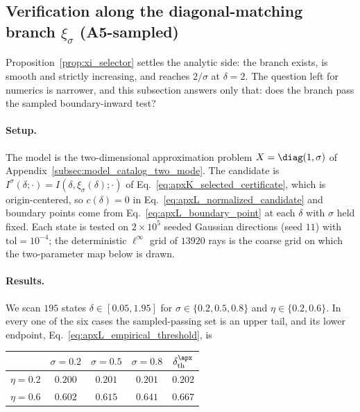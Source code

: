 \documentclass{article}
\begin{document}
\subsection{Verification along the diagonal-matching branch \texorpdfstring{$\xi_\sigma$}{xi\_sigma} (A5-sampled)}
\label{apx:xi_selector_verification}
\label{apx:xi_delta_experiment}%

Proposition~\ref{prop:xi_selector} settles the analytic side: the branch
exists, is smooth and strictly increasing, and reaches $2/\sigma$ at
$\delta=2$. The question left for numerics is narrower, and this subsection
answers only that: does the branch pass the sampled boundary-inward test?

\paragraph{Setup.}
The model is the two-dimensional approximation problem $X=\diag(1,\sigma)$ of
Appendix~\ref{subsec:model_catalog_two_mode}. The candidate is
$I^\sigma(\delta;\cdot)=I(\delta,\xi_\sigma(\delta);\cdot)$ of
Eq.~\eqref{eq:apxK_selected_certificate}, which is origin-centered, so
$c(\delta)=0$ in Eq.~\eqref{eq:apxL_normalized_candidate} and boundary points
come from Eq.~\eqref{eq:apxL_boundary_point} at each $\delta$ with $\sigma$
held fixed. Each state is tested on $2\times10^5$ seeded Gaussian directions
(seed $11$) with $\mathrm{tol}=10^{-4}$; the deterministic $\ell^\infty$ grid
of $13920$ rays is the coarse grid on which the two-parameter map below is
drawn.

\paragraph{Results.}
We scan $195$ states $\delta\in[0.05,1.95]$ for
$\sigma\in\{0.2,0.5,0.8\}$ and $\eta\in\{0.2,0.6\}$. In every one of the six
cases the sampled-passing set is an upper tail, and its lower endpoint,
Eq.~\eqref{eq:apxL_empirical_threshold}, is

\begin{center}
\begin{tabular}{lcccc}
    \toprule
    & $\sigma=0.2$ & $\sigma=0.5$ & $\sigma=0.8$
    & $\delta_\mathrm{th}^\apx$ \\
    \midrule
    $\eta=0.2$ & $0.200$ & $0.201$ & $0.201$ & $0.202$ \\
    $\eta=0.6$ & $0.602$ & $0.615$ & $0.641$ & $0.667$ \\
    \bottomrule
\end{tabular}
\end{center}
\end{document}
